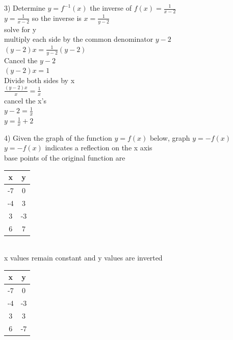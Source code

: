 \documentclass[10pt]{article}
\begin{document}
3) Determine \(y = f^{-1}(x)\) the inverse of \(f(x)=\frac{1}{x-2}\) \\
\(y=\frac{1}{x-2}\) so the inverse is \(x=\frac{1}{y-2}\) \\
solve for y \\
multiply each side by the common denominator \(y-2\) \\
\((y-2)x=\frac{1}{y-2}(y-2)\) \\
Cancel the \(y-2\) \\
\((y-2)x=1\) \\
Divide both sides by x \\
\(\frac{(y-2)x}{x}=\frac{1}{x}\) \\
cancel the x's \\
\(y-2=\frac{1}{x}\) \\
\(y=\frac{1}{x} + 2\)

4) Given the graph of the function \(y = f(x)\) below, graph \(y = -f(x)\) \\
\(y = -f(x)\) indicates a reflection on the x axis \\
base points of the original function are \\
\begin{tabular}{|c|c|}
    \hline
    x  & y  \\
    \hline
    -7 & 0  \\
    -4 & 3  \\
    3  & -3 \\
    6  & 7  \\
    \hline
\end{tabular} \\
x values remain constant and y values are inverted \\
\begin{tabular}{|c|c|}
    \hline
    x  & y  \\
    \hline
    -7 & 0  \\
    -4 & -3 \\
    3  & 3  \\
    6  & -7 \\
    \hline
\end{tabular}
\end{document}
